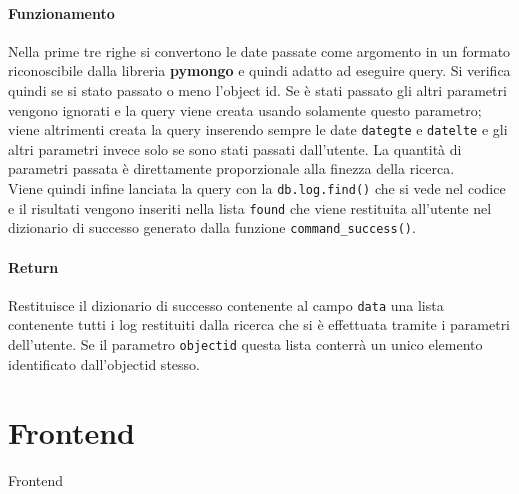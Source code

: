 \documentclass[11pt]{article}
\begin{document}
\paragraph{Funzionamento}
Nella prime tre righe si convertono le date passate come argomento in un formato riconoscibile dalla libreria \textbf{pymongo} e quindi
adatto ad eseguire query. Si verifica quindi se si stato passato o meno l'object id. Se è stati passato gli altri parametri vengono
ignorati e la query viene creata usando solamente questo parametro; viene altrimenti creata la query inserendo sempre le date
\texttt{dategte} e \texttt{datelte} e gli altri parametri invece solo se sono stati passati dall'utente. La quantità di parametri
passata è direttamente proporzionale alla finezza della ricerca.\\
Viene quindi infine lanciata la query con la \texttt{db.log.find()} che si vede nel codice e il risultati vengono inseriti nella
lista \texttt{found} che viene restituita all'utente nel dizionario di successo generato dalla funzione \texttt{command\_success()}.
\paragraph{Return}
Restituisce il dizionario di successo contenente al campo \texttt{data} una lista contenente tutti i log restituiti dalla ricerca
che si è effettuata tramite i parametri dell'utente. Se il parametro \texttt{objectid} questa lista conterrà un unico elemento
identificato dall'objectid stesso.


\section{Frontend}\label{frontend}
Frontend
\end{document}
